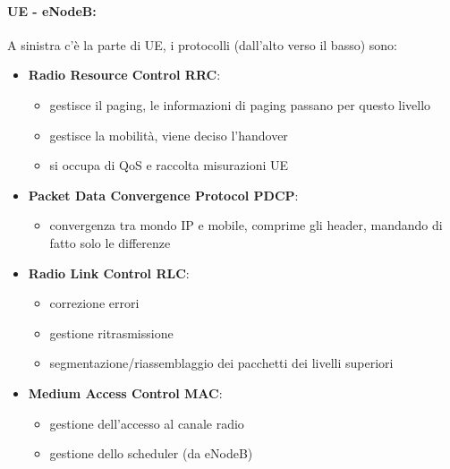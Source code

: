 \paragraph{UE - eNodeB:} A sinistra c'è la parte di UE, i protocolli (dall'alto verso il basso) sono:
\begin{itemize}
	\item \textbf{Radio Resource Control RRC}:
	\begin{itemize}
		\item gestisce il paging, le informazioni di paging passano per questo livello
	
    	\item gestisce la mobilità, viene deciso l'handover
	
    	\item si occupa di QoS e raccolta misurazioni UE
	\end{itemize}
	
	\item \textbf{Packet Data Convergence Protocol PDCP}:
	\begin{itemize}
		\item convergenza tra mondo IP e mobile, comprime gli header, mandando di fatto solo le differenze
	\end{itemize}
	
	\item \textbf{Radio Link Control RLC}:
	\begin{itemize}
		\item correzione errori
	
    	\item gestione ritrasmissione
	
    	\item segmentazione/riassemblaggio dei pacchetti dei livelli superiori
	\end{itemize}
	
	\item \textbf{Medium Access Control MAC}:
	\begin{itemize}
		\item gestione dell'accesso al canale radio
	
    	\item gestione dello scheduler (da eNodeB)
	\end{itemize}
\end{itemize}

